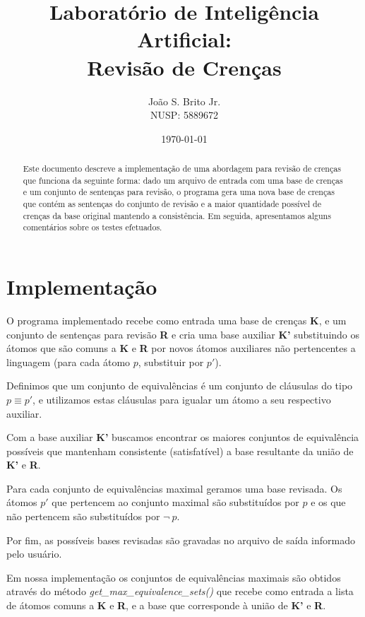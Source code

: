 \documentclass[10pt,a4paper]{amsart}
\author{Jo\~ao S. Brito Jr.\\NUSP: 5889672}
\title{Laboratório de Inteligência Artificial: \\Revisão de Crenças}
\date{\today}
\begin{document}
\begin{abstract}
  Este documento descreve a implementação de uma abordagem para revisão de crenças que funciona da seguinte forma: dado um arquivo de entrada com uma base de crenças e um conjunto de sentenças para revisão, o programa gera uma nova base de crenças que contém as sentenças do conjunto de revisão e a maior quantidade possível de crenças da base original mantendo a consistência.
  Em seguida, apresentamos alguns comentários sobre os testes efetuados.
\end{abstract}

\maketitle


\section{Implementação}
O programa implementado recebe como entrada uma base de crenças \textbf{K}, e um conjunto de sentenças para revisão \textbf{R} e cria uma base auxiliar \textbf{K'} substituindo os átomos que são comuns a \textbf{K} e \textbf{R} por novos átomos auxiliares não pertencentes a linguagem (para cada átomo $p$, substituir por $p'$).

Definimos que um conjunto de equivalências é um conjunto de cláusulas do tipo $p \equiv p'$, e utilizamos estas cláusulas para igualar um átomo a seu respectivo auxiliar.

Com a base auxiliar \textbf{K'} buscamos encontrar os maiores conjuntos de equivalência possíveis que mantenham consistente (satisfatível) a base resultante da união de \textbf{K'} e \textbf{R}.

Para cada conjunto de equivalências maximal geramos uma base revisada. Os átomos $p'$ que pertencem ao conjunto maximal são substituídos por $p$ e os que não pertencem são substituídos por $\neg ~p$.

Por fim, as possíveis bases revisadas são gravadas no arquivo de saída informado pelo usuário.

Em nossa implementação os conjuntos de equivalências maximais são obtidos através do método \emph{get\_max\_equivalence\_sets()} que recebe como entrada a lista de átomos comuns a \textbf{K} e \textbf{R}, e a base que corresponde à união de \textbf{K'} e \textbf{R}.
\end{document}
